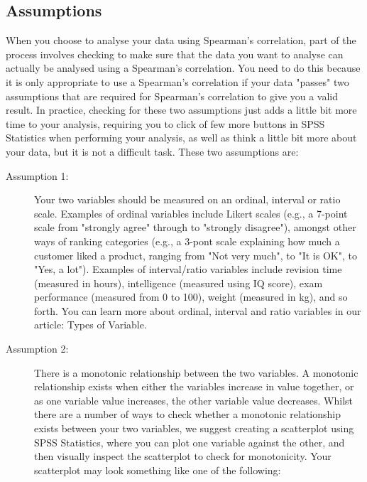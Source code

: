 \documentclass[]{article}
\begin{document}
\subsection{Assumptions}
When you choose to analyse your data using Spearman’s correlation, part of the process involves checking to make sure that the data you want to analyse can actually be analysed using a Spearman’s correlation. You need to do this because it is only appropriate to use a Spearman’s correlation if your data "passes" two assumptions that are required for Spearman’s correlation to give you a valid result. In practice, checking for these two assumptions just adds a little bit more time to your analysis, requiring you to click of few more buttons in SPSS Statistics when performing your analysis, as well as think a little bit more about your data, but it is not a difficult task. These two assumptions are:
\begin{description}
	\item[Assumption 1:] Your two variables should be measured on an ordinal, interval or ratio scale. Examples of ordinal variables include Likert scales (e.g., a 7-point scale from "strongly agree" through to "strongly disagree"), amongst other ways of ranking categories (e.g., a 3-pont scale explaining how much a customer liked a product, ranging from "Not very much", to "It is OK", to "Yes, a lot"). Examples of interval/ratio variables include revision time (measured in hours), intelligence (measured using IQ score), exam performance (measured from 0 to 100), weight (measured in kg), and so forth. You can learn more about ordinal, interval and ratio variables in our article: Types of Variable.
	\item[Assumption 2:] There is a monotonic relationship between the two variables. A monotonic relationship exists when either the variables increase in value together, or as one variable value increases, the other variable value decreases. Whilst there are a number of ways to check whether a monotonic relationship exists between your two variables, we suggest creating a scatterplot using SPSS Statistics, where you can plot one variable against the other, and then visually inspect the scatterplot to check for monotonicity. Your scatterplot may look something like one of the following:
\end{description}
\end{document}
